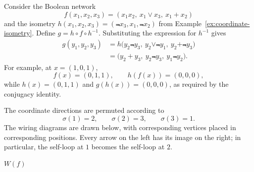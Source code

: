 \begin{example}\label{ex:isometric-wiring}
    Consider the Boolean network
    \[
        f(x_1,x_2,x_3)=(x_1x_2,\ x_1\vee x_3,\ x_1+ x_2)
    \]
    and the isometry $h(x_1,x_2,x_3)=(\Not{x}_3,x_1,\Not{x}_2)$ from Example~\ref{ex:coordinate-isometry}. Define $g=h\circ f\circ h^{-1}$. Substituting the expression for $h^{-1}$ gives
    \begin{align*}
        g(y_1,y_2,y_3)
        &=h\bigl(y_2\Not{y}_3,\ y_2\vee\Not{y}_1,
                 \ y_2+\Not{y}_3\bigr)\\
        &=\bigl(y_2+ y_3,\ y_2\Not{y}_3,
                 \ y_1\Not{y}_2\bigr).
    \end{align*}
    For example, at $x=(1,0,1)$,
    \[
        f(x)=(0,1,1),\qquad h(f(x))=(0,0,0),
    \]
    while $h(x)=(0,1,1)$ and $g(h(x))=(0,0,0)$, as required by the conjugacy identity.

    The coordinate directions are permuted according to
    \[
        \sigma(1)=2,\qquad\sigma(2)=3,\qquad\sigma(3)=1.
    \]
    The wiring diagrams are drawn below, with corresponding vertices placed in corresponding positions. Every arrow on the left has its image on the right; in particular, the self-loop at $1$ becomes the self-loop at $2$.

    \begin{center}
        \begin{minipage}{0.46\linewidth}
            \centering

            \small $W(f)$
        \end{minipage}
        \hfill
        \begin{minipage}{0.46\linewidth}
            \centering


\end{minipage}
\end{center}
\end{example}
